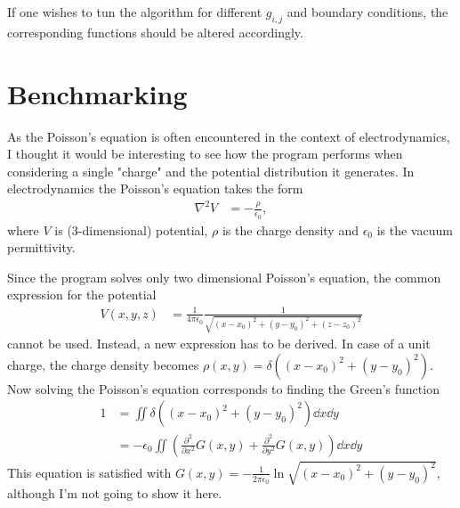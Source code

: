 \documentclass[12pt, letterpaper]{article}
\begin{document}
If one wishes to tun the algorithm for different $g_{i,j}$ and boundary conditions, the corresponding functions should be altered accordingly.

\section{Benchmarking}
As the Poisson's equation is often encountered in the context of electrodynamics, I thought it would be interesting to see how the program performs when considering a single "charge" and the potential distribution it generates.
In electrodynamics the Poisson's equation takes the form
\begin{align*}
  \nabla^2 V &= -\frac{\rho}{\epsilon_0},
\end{align*}
where $V$ is (3-dimensional) potential, $\rho$ is the charge density and $\epsilon_0$ is the vacuum permittivity.

Since the program solves only two dimensional Poisson's equation, the common expression for the potential
\begin{align*}
  V(x,y,z) &= \frac{1}{4\pi \epsilon_0} \frac{1}{\sqrt{(x-x_0)^2+(y-y_0)^2+(z-z_0)^2}}
\end{align*}
cannot be used.
Instead, a new expression has to be derived.
In case of a unit charge, the charge density becomes $\rho(x,y)=\delta((x-x_0)^2+(y-y_0)^2)$.
Now solving the Poisson's equation corresponds to finding the Green's function
\begin{align*}
  1 &= \iint  \delta((x-x_0)^2+(y-y_0)^2)\dd x\dd y \\
  &= -\epsilon_0 \iint \left(
  \frac{\partial^2}{\partial x^2}G(x,y)
  +\frac{\partial^2}{\partial y^2}G(x,y)
  \right)\dd x\dd y 
\end{align*}
This equation is satisfied with $G(x,y) = -\frac{1}{2\pi \epsilon_0}\ln\sqrt{(x-x_0)^2+(y-y_0)^2}$, although I'm not going to show it here.
\end{document}

